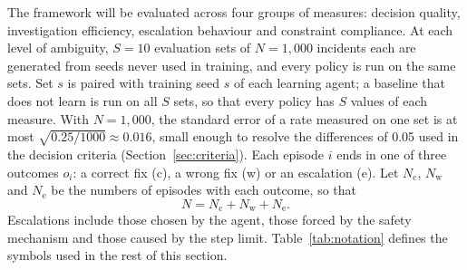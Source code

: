 The framework will be evaluated across four groups of measures: decision quality, investigation efficiency, escalation behaviour and constraint compliance. At each level of ambiguity, $S = 10$ evaluation sets of $N = 1{,}000$ incidents each are generated from seeds never used in training, and every policy is run on the same sets. Set $s$ is paired with training seed $s$ of each learning agent; a baseline that does not learn is run on all $S$ sets, so that every policy has $S$ values of each measure. With $N = 1{,}000$, the standard error of a rate measured on one set is at most $\sqrt{0.25/1000} \approx 0.016$, small enough to resolve the differences of 0.05 used in the decision criteria (Section~\ref{sec:criteria}). Each episode $i$ ends in one of three outcomes $o_i$: a correct fix (c), a wrong fix (w) or an escalation (e). Let $N_{\text{c}}$, $N_{\text{w}}$ and $N_{\text{e}}$ be the numbers of episodes with each outcome, so that
\begin{equation}
N = N_{\text{c}} + N_{\text{w}} + N_{\text{e}}.
\end{equation}
Escalations include those chosen by the agent, those forced by the safety mechanism and those caused by the step limit. Table~\ref{tab:notation} defines the symbols used in the rest of this section.


